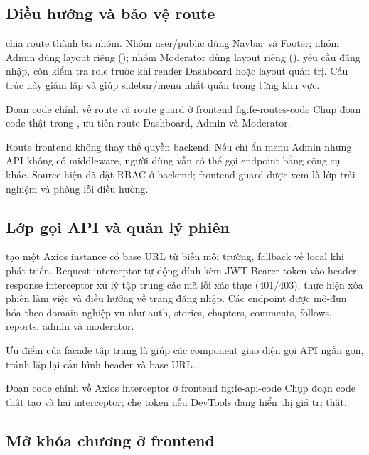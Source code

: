 \subsection{Điều hướng và bảo vệ route}

 chia route thành ba nhóm. Nhóm user/public dùng Navbar và Footer; nhóm Admin dùng layout riêng (); nhóm Moderator dùng layout riêng ().  yêu cầu đăng nhập, còn  kiểm tra role trước khi render Dashboard hoặc layout quản trị. Cấu trúc này giảm lặp và giúp sidebar/menu nhất quán trong từng khu vực.

  {Đoạn code chính về route và route guard ở frontend}
  {fig:fe-routes-code}
  {Chụp đoạn code thật trong , ưu tiên route Dashboard, Admin và Moderator.}

Route frontend không thay thế quyền backend. Nếu chỉ ẩn menu Admin nhưng API không có middleware, người dùng vẫn có thể gọi endpoint bằng công cụ khác. Source hiện đã đặt RBAC ở backend; frontend guard được xem là lớp trải nghiệm và phòng lỗi điều hướng.

\subsection{Lớp gọi API và quản lý phiên}

 tạo một Axios instance có base URL từ biến môi trường, fallback về local khi phát triển. Request interceptor tự động đính kèm JWT Bearer token vào header; response interceptor xử lý tập trung các mã lỗi xác thực (401/403), thực hiện xóa phiên làm việc và điều hướng về trang đăng nhập. Các endpoint được mô-đun hóa theo domain nghiệp vụ như auth, stories, chapters, comments, follows, reports, admin và moderator.

Ưu điểm của facade tập trung là giúp các component giao diện gọi API ngắn gọn, tránh lặp lại cấu hình header và base URL.

  {Đoạn code chính về Axios interceptor ở frontend}
  {fig:fe-api-code}
  {Chụp đoạn code thật tạo  và hai interceptor; che token nếu DevTools đang hiển thị giá trị thật.}
\subsection{Mở khóa chương ở frontend}

